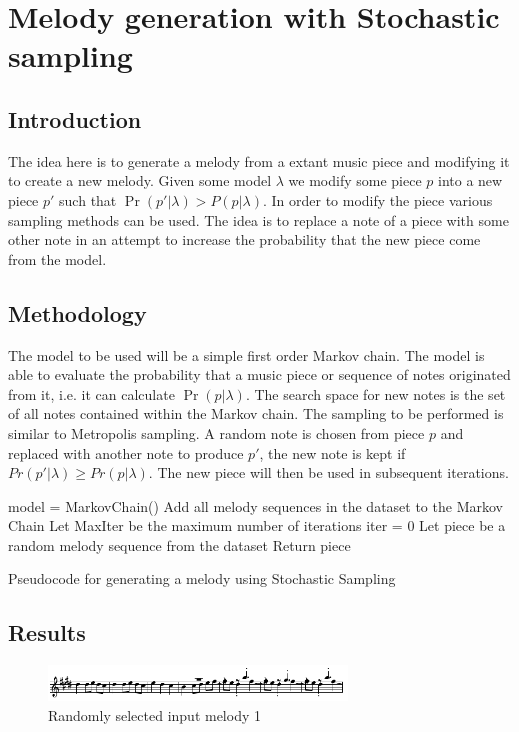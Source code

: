 \chapter{Melody generation with Stochastic sampling}
\section{Introduction}
The idea here is to generate a melody from a extant music piece and modifying it to create a new melody. Given some model $\lambda$ we modify some piece $p$ into a new piece $p'$ such that $\Pr(p'|\lambda) > P(p|\lambda)$.
In order to modify the piece various sampling methods can be used. The idea is to replace a note of a piece with some other note in an attempt to increase the probability that the new piece come from the model. 

\section{Methodology}
The model to be used will be a simple first order Markov chain. The model is able to evaluate the probability that a music piece or sequence of notes originated from it, i.e. it can calculate $\Pr(p|\lambda)$. The search space for new notes is the set of all notes contained within the Markov chain.
The sampling to be performed is similar to Metropolis sampling. A random note is chosen from piece $p$ and replaced with another note to produce $p'$, the new note is kept if $Pr(p'|\lambda) \geq Pr(p|\lambda)$. The new piece will then be used in subsequent iterations.

\begin{algorithm}
 model = MarkovChain()\;
 Add all melody sequences in the dataset to the Markov Chain\;
 Let MaxIter be the maximum number of iterations\;
 iter = 0\;
 Let piece be a random melody sequence from the dataset\;
 Return piece\;
 \caption{Pseudocode for generating a melody using Stochastic Sampling}
\end{algorithm}

\section{Results}
\begin{figure}[h!]
\centerline{\includegraphics[width=300px]{../images/swr_in.pdf}}
\caption{Randomly selected input melody 1}
\label{ims:swr_in}
\end{figure}

